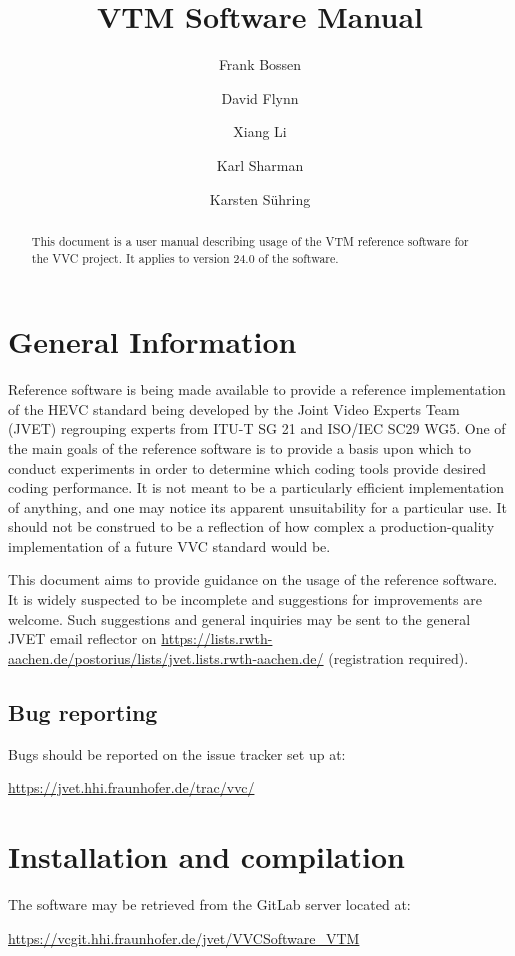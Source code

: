 \documentclass[a4paper,11pt]{jvetdoc}
\title{VTM Software Manual}
\author{%
	Frank Bossen
	\email{frank@bossentech.com}
	\and
	David Flynn
	\and
	Xiang Li
	\email{xlxiangli@google.com}
	\and
	Karl Sharman
	\email{karl.sharman@eu.sony.com}
	\and
	Karsten S\"uhring
	\email{karsten.suehring@hhi.fraunhofer.de}
}
\begin{document}
\maketitle
\begin{abstract}
This document is a user manual describing usage of the VTM reference software
for the VVC project. It applies to version 24.0 of the software.
\end{abstract}

\tableofcontents
\listoftables


\section{General Information}
Reference software is being made available to provide a reference
implementation of the HEVC standard being developed by the Joint 
Video Experts Team (JVET) regrouping experts from
ITU-T SG 21 and ISO/IEC SC29 WG5. One of the main goals of the
reference software is to provide a basis upon which to conduct
experiments in order to determine which coding tools provide desired
coding performance. It is not meant to be a particularly efficient
implementation of anything, and one may notice its apparent
unsuitability for a particular use. It should not be construed to be a
reflection of how complex a production-quality implementation of a
future VVC standard would be.

This document aims to provide guidance on the usage of the reference
software. It is widely suspected to be incomplete and suggestions for
improvements are welcome. Such suggestions and general inquiries may be
sent to the general JVET email reflector on
\url{https://lists.rwth-aachen.de/postorius/lists/jvet.lists.rwth-aachen.de/} 
(registration required).

\subsection*{Bug reporting}
Bugs should be reported on the issue tracker set up at:

\url{https://jvet.hhi.fraunhofer.de/trac/vvc/}

\section{Installation and compilation}
The software may be retrieved from the GitLab server located at:

\url{https://vcgit.hhi.fraunhofer.de/jvet/VVCSoftware_VTM}
\end{document}
